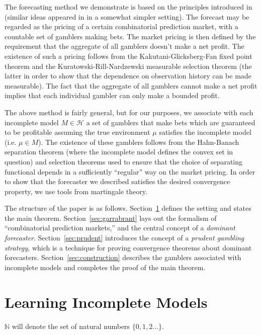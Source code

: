 \documentclass[11pt]{article}
\theoremstyle{definition}
\theoremstyle{plain}
\newcommand{\Nats}{\mathbb{N}}
\newcommand{\MC}{\mathcal{H}}
\begin{document}
The forecasting method we demonstrate is based on the principles introduced in \cite{Garrabrant_2016} (similar ideas appeared in \cite{Vovk_2005} in a somewhat simpler setting). The forecast may be regarded as the pricing of a certain combinatorial prediction market, with a countable set of gamblers making bets. The market pricing is then defined by the requirement that the aggregate of all gamblers doesn't make a net profit. The existence of such a pricing follows from the Kakutani-Glicksberg-Fan fixed point theorem and the Kuratowski-Rill-Nardzewski measurable selection theorem (the latter in order to show that the dependence on observation history can be made measurable). The fact that the aggregate of all gamblers cannot make a net profit implies that each individual gambler can only make a bounded profit.

The above method is fairly general, but for our purposes, we associate with each incomplete model $M \in \MC$ a set of gamblers that make bets which are guaranteed to be profitable assuming the true environment $\mu$ satisfies the incomplete model (i.e. $\mu \in M$). The existence of these gamblers follows from the Hahn-Banach separation theorem (where the incomplete model defines the convex set in question) and selection theorems used to ensure that the choice of separating functional depends in a sufficiently \enquote{regular} way on the market pricing. In order to show that the forecaster we described satisfies the desired convergence property, we use tools from martingale theory.

The structure of the paper is as follows. Section~\ref{sec:learning} defines the setting and states the main theorem. Section~\ref{sec:garrabrant} lays out the formalism of \enquote{combinatorial prediction markets,} and the central concept of a \emph{dominant forecaster}. Section~\ref{sec:prudent} introduces the concept of a \emph{prudent gambling strategy}, which is a technique for proving convergence theorems about dominant forecasters. Section~\ref{sec:construction} describes the gamblers associated with incomplete models and completes the proof of the main theorem.

\section{Learning Incomplete Models}
\label{sec:learning}

$\Nats$ will denote the set of natural numbers $\{0, 1, 2 \ldots\}$.
\end{document}
